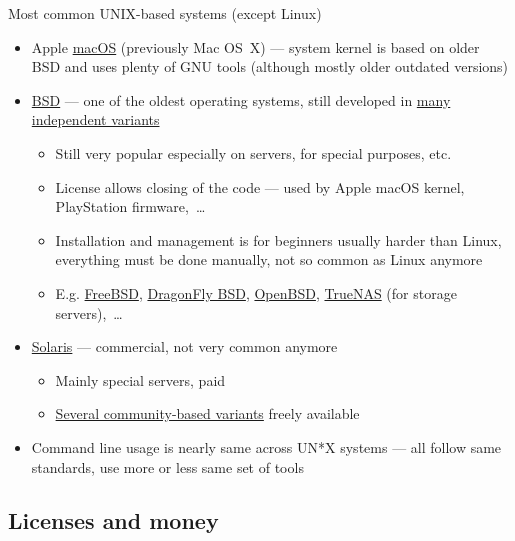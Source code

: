 \documentclass[compress, xelatex, 11pt, xcolor=svgnames, aspectratio=169, url={hyphens, lowtilde}]{beamer}
\begin{document}
\begin{frame}{Most common UNIX-based systems (except Linux)}
	\begin{itemize}
		\item Apple \href{https://en.wikipedia.org/wiki/macOS}{macOS} (previously Mac OS~X) --- system kernel is based on older BSD and uses plenty of GNU tools (although mostly older outdated versions)
		\item \href{https://en.wikipedia.org/wiki/Berkeley_Software_Distribution}{BSD} --- one of the oldest operating systems, still developed in \href{https://distrowatch.com/search.php?ostype=BSD}{many independent variants}
		\begin{itemize}
			\item Still very popular especially on servers, for special purposes, etc.
			\item License allows closing of the code --- used by Apple macOS kernel, PlayStation firmware,~\ldots
			\item Installation and management is for beginners usually harder than Linux, everything must be done manually, not so common as Linux anymore
			\item E.g. \href{https://www.freebsd.org/}{FreeBSD}, \href{https://www.dragonflybsd.org/}{DragonFly BSD}, \href{https://www.openbsd.org/}{OpenBSD}, \href{https://www.truenas.com/}{TrueNAS} (for storage servers),~\ldots
		\end{itemize}
		\item \href{https://en.wikipedia.org/wiki/Oracle_Solaris}{Solaris} --- commercial, not very common anymore
		\begin{itemize}
			\item Mainly special servers, paid
			\item \href{https://distrowatch.com/search.php?ostype=Solaris}{Several community-based variants} freely available
		\end{itemize}
		\item Command line usage is nearly same across UN*X systems --- all follow same standards, use more or less same set of tools
	\end{itemize}
\end{frame}

\subsection{Licenses and money}
\end{document}
